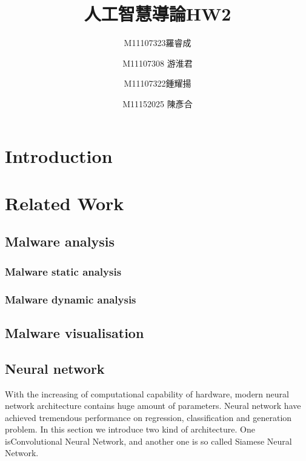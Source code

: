 \documentclass{article}
\title{人工智慧導論HW2}
\author{M11107323羅睿成 \and M11107308 游淮君 \and M11107322鍾耀揚 \and M11152025 陳彥合}
\begin{document}
\maketitle
\section{Introduction}

\section{Related Work}
\subsection{Malware analysis}
\subsubsection{Malware static analysis}
\subsubsection{Malware dynamic analysis}
\subsection{Malware visualisation}
\subsection{Neural network} 
With the increasing of computational capability of hardware, modern neural network architecture contains huge amount of parameters.
Neural network have achieved tremendous performance on regression, classification and generation problem.
In this section we introduce two kind of architecture. One isConvolutional Neural Network, and another one is so called Siamese Neural Network.
\end{document}
